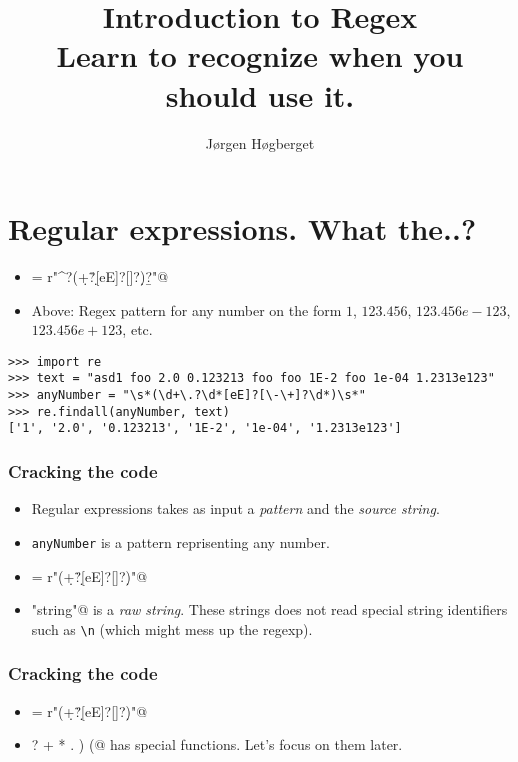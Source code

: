 \documentclass{beamer}
\title[Regex - for the people!]{Introduction to Regex\\Learn to recognize when you should use it.}
\author{Jørgen Høgberget}
\date{}
\begin{document}
\begin{frame}
\titlepage
\end{frame}


\section{Regular expressions. What the..?}

\begin{frame}[fragile]
\scriptsize
\begin{itemize}
 \item \verb@anyNumber = r"^?\s*(\d+\.?\d*[eE]?[\-\+]?\d*)\s*\b?"@
\pause \item Above: Regex pattern for any number on the form $1$, $123.456$, $123.456e-123$, $123.456e+123$, etc.
\end{itemize}
\end{frame}

\begin{frame}[fragile]
\scriptsize
\begin{verbatim}
>>> import re
>>> text = "asd1 foo 2.0 0.123213 foo foo 1E-2 foo 1e-04 1.2313e123" 
>>> anyNumber = "\s*(\d+\.?\d*[eE]?[\-\+]?\d*)\s*"
>>> re.findall(anyNumber, text)
['1', '2.0', '0.123213', '1E-2', '1e-04', '1.2313e123']
\end{verbatim}
\normalsize
\end{frame}

\begin{frame}[fragile]
\frametitle{Cracking the code}
\scriptsize
\begin{itemize}
 \item Regular expressions takes as input a \textit{pattern} and the \textit{source string}.
 \pause \item \verb+anyNumber+ is a pattern reprisenting any number.
 \item \verb@anyNumber = r"\s*(\d+\.?\d*[eE]?[\-\+]?\d*)\s*"@
 \pause \item \verb@r"string"@ is a \textit{raw string}. These strings does not read special string identifiers such as \verb+\n+ (which might mess up the regexp).
\end{itemize}
\normalsize
\end{frame}

\begin{frame}[fragile]
\frametitle{Cracking the code}
\scriptsize
\begin{itemize}
 \item \verb@anyNumber = r"\s*(\d+\.?\d*[eE]?[\-\+]?\d*)\s*"@
 \item \verb@? + * . ) (@ has special functions. Let's focus on them later.

\end{itemize}
\normalsize
\end{frame}
\end{document}

